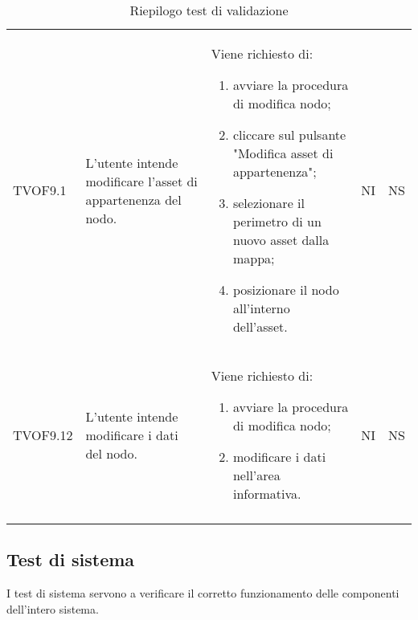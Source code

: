 \begin{longtable}{p{1.8cm}!{\VRule[1pt]}p{3.5cm}!{\VRule[1pt]}p{5.5cm}!{\VRule[1pt]}p{1cm}!{\VRule[1pt]}p{1cm}}
	TVOF9.1 & L'utente intende modificare l'asset di appartenenza del nodo. & Viene richiesto di: \begin{enumerate} 
		\item avviare la procedura di modifica nodo; 
		\item cliccare sul pulsante "Modifica asset di appartenenza"; 
		\item selezionare il perimetro di un nuovo asset dalla mappa; 
		\item posizionare il nodo all'interno dell'asset. 
	\end{enumerate} & NI & NS \\ 
	TVOF9.12 & L'utente intende modificare i dati del nodo. & Viene richiesto di: \begin{enumerate} 
		\item avviare la procedura di modifica nodo; 
		\item modificare i dati nell'area informativa. 
	\end{enumerate} & NI & NS \\ 
	\caption{Riepilogo test di validazione}
\end{longtable}

	\subsection{Test di sistema}
		I test di sistema servono a verificare il corretto funzionamento delle componenti dell'intero sistema.
		
